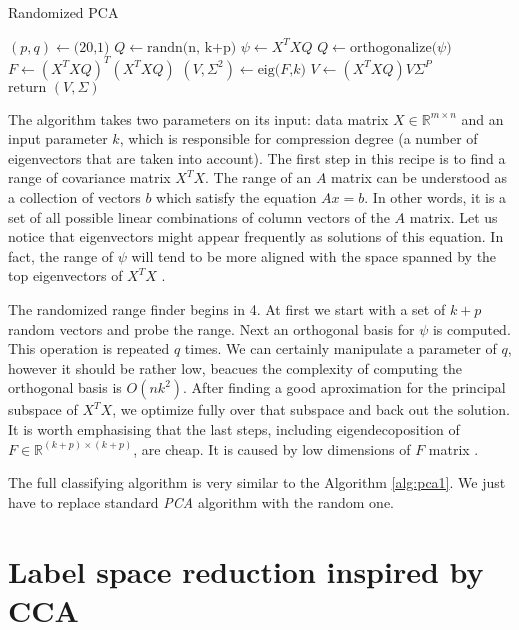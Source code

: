 \begin{algorithm}
    \caption{Randomized PCA}\label{alg:rpca1}
    \begin{algorithmic}[1]
        \State $(p,q) \leftarrow \text{(20,1)}$
        \State $Q \leftarrow \text{randn(n, k+p)}$
            \State $\psi \leftarrow X^TXQ$
            \State $Q \leftarrow \text{orthogonalize($\psi$)}$
            \EndFor
            \State $F \leftarrow (X^TXQ)^T(X^TXQ)$
            \State $(V,\Sigma^2) \leftarrow \text{eig($F$,$k$)}$
            \State $V \leftarrow (X^TXQ)V\Sigma^P$
            \State $\text{return } (V, \Sigma)$
        \EndFunction
    \end{algorithmic}
\end{algorithm}

The algorithm takes two parameters on its input: data matrix $X \in \mathbb{R}^{m \times n}$ and an input parameter $k$, which is responsible for compression degree (a number of eigenvectors that are taken into account). The first step in this recipe is to find a range of covariance matrix $X^TX$. The range of an $A$ matrix can be understood as a collection of vectors $b$ which satisfy the equation $Ax=b$. In other words, it is a set of all possible linear combinations of column vectors of the $A$ matrix.  Let us notice that eigenvectors might appear frequently as solutions of this equation. In fact, the range of $\psi$ will tend to be more aligned with the space spanned by the top eigenvectors of $X^TX$ \cite{Mineiro}. 

The randomized range finder begins in 4. At first we start with a set of $k+p$ random vectors and probe the range. Next an orthogonal basis for $\psi$ is computed. This operation is repeated $q$ times. We can certainly manipulate a parameter of $q$, however it should be rather low, beacues the complexity of computing the orthogonal basis is $O(nk^2)$. 
After finding a good aproximation for the principal subspace of $X^TX$, we optimize fully over that subspace and back out the solution. It is worth emphasising that the last steps, including eigendecoposition of $F \in \mathbb{R}^{(k+p) \times (k+p)}$, are cheap. It is caused by low dimensions of $F$ matrix \cite{Mineiro}.

The full classifying algorithm is very similar to the Algorithm \ref{alg:pca1}. We just have to replace standard \textit{PCA} algorithm with the random one.

\section{Label space reduction inspired by CCA}


